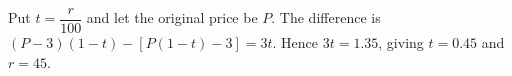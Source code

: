 Put $t=\dfrac{r}{100}$ and let the original price be $P$. The difference is $(P-3)(1-t)-[P(1-t)-3]=3t$. Hence $3t=1.35$, giving $t=0.45$ and $\boxed{r=45}$.
